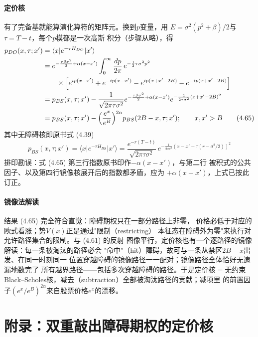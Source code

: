 \paragraph{定价核}
有了完备基就能算演化算符的矩阵元。换到$p$变量，用
$E=\sigma^{2}(p^{2}+\beta)/2$与$\tau=T-t$，每个$p$模都是一次高斯
积分（步骤从略），得
\begin{align*}
p_{DO}(x,\tau;x')&=\langle x\vert e^{-\tau H_{DO}}\vert x'\rangle\\
&=e^{-\frac{\tau\beta\sigma^{2}}{2}+\alpha(x-x')}\int_{0}^{\infty}
\frac{dp}{2\pi}\,e^{-\frac{1}{2}\tau\sigma^{2}p^{2}}\\
&\qquad\times\Bigl[e^{ip(x-x')}+e^{-ip(x-x')}-e^{ip(x+x'-2B)}
-e^{-ip(x+x'-2B)}\Bigr]\\
&=p_{BS}(x,\tau;x')-\frac{1}{\sqrt{2\pi\tau\sigma^{2}}}
e^{-\frac{\tau\beta\sigma^{2}}{2}+\alpha(x-x')}
e^{-\frac{1}{2\tau\sigma^{2}}(x+x'-2B)^{2}}\\
&=p_{BS}(x,\tau;x')-\Bigl(\frac{e^{x}}{e^{B}}\Bigr)^{2\alpha}
p_{BS}(2B-x,\tau;x');\qquad x,x'>B
\tag{4.65}
\end{align*}
其中无障碍核即原书式 (4.39)
\begin{equation*}
p_{BS}(x,\tau;x')=\langle x\vert e^{-\tau H_{BS}}\vert x'\rangle
=\frac{e^{-r(T-t)}}{\sqrt{2\pi\tau\sigma^{2}}}\,
e^{-\frac{1}{2\tau\sigma^{2}}\left(x-x'+\tau(r-\sigma^{2}/2)\right)^{2}}
\end{equation*}
排印勘误：式 (4.65) 第三行指数原书印作$-\alpha(x-x')$，与第二行
被积式的公共因子、以及第四行镜像核展开后的指数都矛盾，应为
$+\alpha(x-x')$，上式已按此订正。

\paragraph{镜像法解读}
结果 (4.65) 完全符合直觉：障碍期权只在一部分路径上非零，
价格必低于对应的欧式看涨；势$V(x)$正是通过"限制（restricting）
本征态在障碍外为零"来执行对允许路径集合的限制。与 (4.61) 的反射
图像平行，定价核也有一个逐路径的镜像解读：每一条被淘汰的路径必会
"命中"（hit）障碍，故可与一条从禁区$2B-x$出发、在同一时刻同一
位置穿越障碍的镜像路径一一配对；镜像路径全体恰好无遗漏地数完了
所有越界路径——包括多次穿越障碍的路径。于是定价核$=$无约束
Black--Scholes核，减去（subtraction）全部被淘汰路径的贡献；减项里
的前置因子$(e^{x}/e^{B})^{2\alpha}$来自股票价格$e^{x}$的漂移。

\section{附录：双重敲出障碍期权的定价核}

